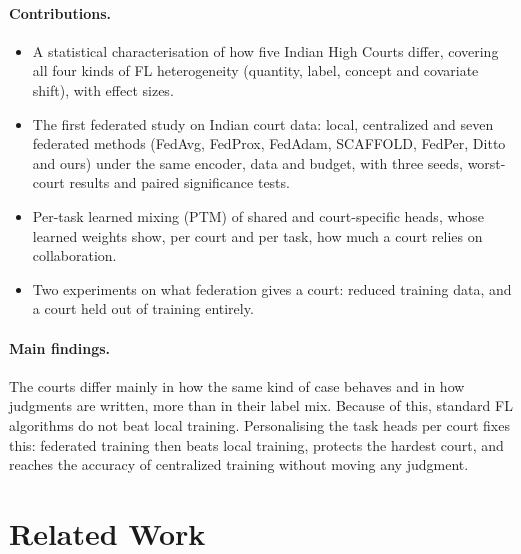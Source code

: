 \documentclass[11pt,a4paper]{article}
\begin{document}
\paragraph{Contributions.}
\begin{itemize}
  \item A statistical characterisation of how five Indian High Courts differ, covering all four kinds
        of FL heterogeneity (quantity, label, concept and covariate shift), with effect sizes.
  \item The first federated study on Indian court data: local, centralized and seven federated methods
        (FedAvg, FedProx, FedAdam, SCAFFOLD, FedPer, Ditto and ours) under the same encoder, data and
        budget, with three seeds, worst-court results and paired significance tests.
  \item Per-task learned mixing (PTM) of shared and court-specific heads, whose learned weights show,
        per court and per task, how much a court relies on collaboration.
  \item Two experiments on what federation gives a court: reduced training data, and a court held
        out of training entirely.
\end{itemize}

\paragraph{Main findings.} The courts differ mainly in how the same kind of case behaves and in how
judgments are written, more than in their label mix. Because of this, standard FL algorithms do not
beat local training. Personalising the task heads per court fixes this: federated training then beats
local training, protects the hardest court, and reaches the accuracy of centralized training without
moving any judgment.

\section{Related Work}
\end{document}
